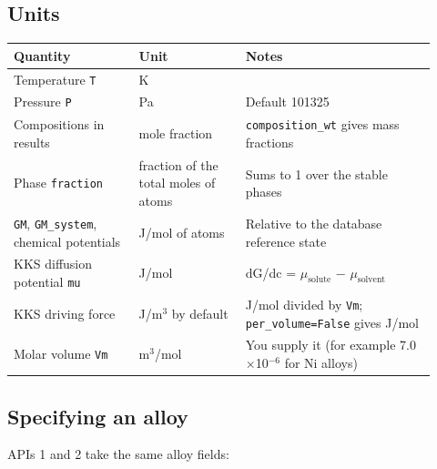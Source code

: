 \documentclass[12pt,a4paper]{article}
\begin{document}
\subsection*{Units}
\begingroup\small
\begin{longtable}{>{\raggedright\arraybackslash}p{0.271\linewidth}>{\raggedright\arraybackslash}p{0.239\linewidth}>{\raggedright\arraybackslash}p{0.411\linewidth}}
\toprule
\textbf{Quantity} & \textbf{Unit} & \textbf{Notes} \\
\midrule
\endhead
Temperature \texttt{T} & K &  \\
Pressure \texttt{P} & Pa & Default 101325 \\
Compositions in results & mole fraction & \texttt{composition\_\allowbreak{}wt} gives mass fractions \\
Phase \texttt{fraction} & fraction of the total moles of atoms & Sums to 1 over the stable phases \\
\texttt{GM}, \texttt{GM\_\allowbreak{}system}, chemical potentials & J/mol of atoms & Relative to the database reference state \\
KKS diffusion potential \texttt{mu} & J/mol & dG/dc = \(\mu_{\mathrm{solute}}\) \(-\) \(\mu_{\mathrm{solvent}}\) \\
KKS driving force & J/m\(^{3}\) by default & J/mol divided by \texttt{Vm}; \texttt{per\_\allowbreak{}volume=False} gives J/mol \\
Molar volume \texttt{Vm} & m\(^{3}\)/mol & You supply it (for example 7.0\(\times\)10\(^{-6}\) for Ni alloys) \\
\bottomrule
\end{longtable}
\endgroup

\subsection*{Specifying an alloy}
APIs 1 and 2 take the same alloy fields:
\end{document}
